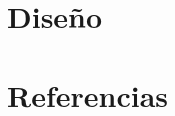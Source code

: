\documentclass[11pt]{article}
\begin{document}

\section{Diseño}



\section{Referencias}
    

\end{document}
